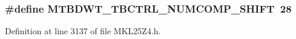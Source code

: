 \subsubsection[{\texorpdfstring{M\+T\+B\+D\+W\+T\+\_\+\+T\+B\+C\+T\+R\+L\+\_\+\+N\+U\+M\+C\+O\+M\+P\+\_\+\+S\+H\+I\+FT}{MTBDWT_TBCTRL_NUMCOMP_SHIFT}}]{\setlength{\rightskip}{0pt plus 5cm}\#define M\+T\+B\+D\+W\+T\+\_\+\+T\+B\+C\+T\+R\+L\+\_\+\+N\+U\+M\+C\+O\+M\+P\+\_\+\+S\+H\+I\+FT~28}\hypertarget{group___m_t_b_d_w_t___register___masks_ga6f08c35f3754371bd7ee8209b27c746e}{}\label{group___m_t_b_d_w_t___register___masks_ga6f08c35f3754371bd7ee8209b27c746e}


Definition at line 3137 of file M\+K\+L25\+Z4.\+h.

